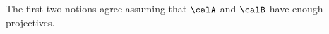 \begin{definition}
\begin{enumerate}
    \end{enumerate}
    The first two notions agree assuming that $\calA$ and $\calB$ have enough projectives. 
\end{definition}
